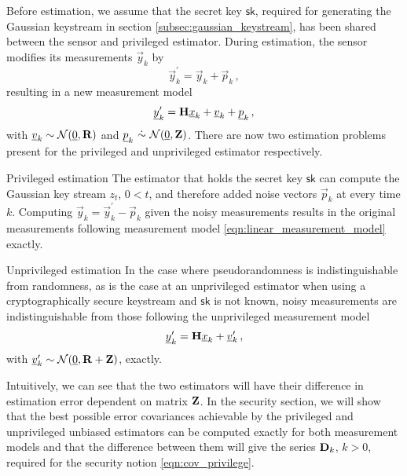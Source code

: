 \documentclass[letterpaper, 10 pt, conference]{IEEEtran}
\theoremstyle{definition}
\begin{document}
Before estimation, we assume that the secret key $\mathsf{sk}$, required for generating the Gaussian keystream in section \ref{subsec:gaussian_keystream}, has been shared between the sensor and privileged estimator. During estimation, the sensor modifies its measurements $\vec{y}_k$ by
\begin{equation}\label{eqn:modified_measurement}
   \vec{y}^\prime_k = \vec{y}_k + \vec{p}_k\,,
\end{equation}
resulting in a new measurement model
\begin{equation}
   {\underline{y}}^\prime_k = {{\mathbf{H}}}{\underline{x}}_k + {\underline{v}}_k + {\underline{p}}_k\,,
\end{equation}
with ${\underline{v}}_k\sim \mathcal{N}({\underline{0}},{{\mathbf{R}}})$ and $\vec{p}_k\ \dot{\sim}\ \mathcal{N}(\vec{0},\mat{Z})$. There are now two estimation problems present for the privileged and unprivileged estimator respectively.
\begin{LaTeXdescription}
   \item[Privileged estimation] The estimator that holds the secret key $\mathsf{sk}$ can compute the Gaussian key stream $z_t$, $0<t$, and therefore added noise vectors $\vec{p}_k$ at every time $k$. Computing $\vec{y}_k = \vec{y}^\prime_k - \vec{p}_k$ given the noisy measurements results in the original measurements following measurement model \eqref{eqn:linear_measurement_model} exactly.
   \item[Unprivileged estimation] In the case where pseudorandomness is indistinguishable from randomness, as is the case at an unprivileged estimator when using a cryptographically secure keystream and $\mathsf{sk}$ is not known, noisy measurements are indistinguishable from those following the unprivileged measurement model 
   \begin{equation}\label{eqn:unprivileged_measurement_model}
      \vec{y}^\prime_k = \mat{H}\vec{x}_k + \vec{v}^\prime_k\,,
   \end{equation}
   with ${\underline{v}}^\prime_k\sim \mathcal{N}({\underline{0}},{{\mathbf{R}}}+{{\mathbf{Z}}})$, exactly.
\end{LaTeXdescription}

Intuitively, we can see that the two estimators will have their difference in estimation error dependent on matrix ${{\mathbf{Z}}}$. In the security section, we will show that the best possible error covariances achievable by the privileged and unprivileged unbiased estimators can be computed exactly for both measurement models and that the difference between them will give the series ${{\mathbf{D}}}_k$, $k>0$, required for the security notion \eqref{eqn:cov_privilege}.
\end{document}
